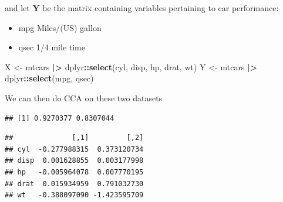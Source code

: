 \documentclass[
]{book}
\newenvironment{Shaded}{\begin{snugshade}}{\end{snugshade}}
\newcommand{\FunctionTok}[1]{\textcolor[rgb]{0.13,0.29,0.53}{\textbf{#1}}}
\newcommand{\NormalTok}[1]{#1}
\newcommand{\OtherTok}[1]{\textcolor[rgb]{0.56,0.35,0.01}{#1}}
\newcommand{\SpecialCharTok}[1]{\textcolor[rgb]{0.81,0.36,0.00}{\textbf{#1}}}
\providecommand{\tightlist}{%
  \setlength{\itemsep}{0pt}\setlength{\parskip}{0pt}}
\theoremstyle{definition}
\theoremstyle{definition}
\theoremstyle{definition}
\theoremstyle{definition}
\theoremstyle{remark}
\begin{document}
and let \(\mathbf Y\) be the matrix containing variables pertaining to car performance:

\begin{itemize}
\tightlist
\item
  mpg Miles/(US) gallon
\item
  qsec 1/4 mile time
\end{itemize}

\begin{Shaded}
\begin{Highlighting}[]
\NormalTok{X }\OtherTok{\textless{}{-}}\NormalTok{ mtcars }\SpecialCharTok{|\textgreater{}}\NormalTok{ dplyr}\SpecialCharTok{::}\FunctionTok{select}\NormalTok{(cyl, disp, hp, drat, wt)}
\NormalTok{Y }\OtherTok{\textless{}{-}}\NormalTok{ mtcars }\SpecialCharTok{|\textgreater{}}\NormalTok{ dplyr}\SpecialCharTok{::}\FunctionTok{select}\NormalTok{(mpg, qsec)}
\end{Highlighting}
\end{Shaded}

We can then do CCA on these two datasets

\begin{Shaded}
\end{Shaded}

\begin{verbatim}
## [1] 0.9270377 0.8307044
\end{verbatim}

\begin{Shaded}
\end{Shaded}

\begin{verbatim}
##              [,1]         [,2]
## cyl  -0.277988315  0.373120734
## disp  0.001628855  0.003177998
## hp   -0.005964078  0.007770195
## drat  0.015934959  0.791032730
## wt   -0.388097090 -1.423595709
\end{verbatim}

\begin{Shaded}
\end{Shaded}
\end{document}
